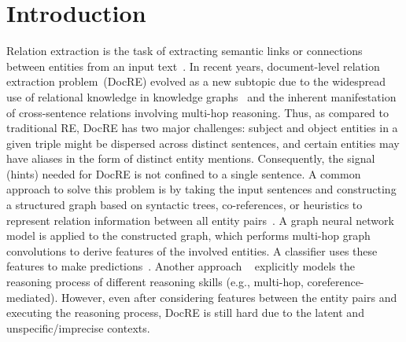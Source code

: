 \documentclass[letterpaper]{article} %
\begin{document}
\begin{abstract}
\end{abstract}


\section{Introduction}
Relation extraction is the task of extracting semantic links or connections between entities from an input text~\cite{baldini-soares-etal-2019-matching}.
In recent years, document-level relation extraction problem~(DocRE) evolved as a new subtopic due to the widespread use of relational knowledge in knowledge graphs~\cite{yu-etal-2017-improved} and the inherent manifestation of cross-sentence relations involving multi-hop reasoning. 
Thus, as compared to traditional RE, DocRE has two major challenges: subject and object entities in a given triple might be dispersed across distinct sentences, and certain entities may have aliases in the form of distinct entity mentions. Consequently, the signal (hints) needed for DocRE is not confined to a single sentence. A common approach to solve this problem is by taking the input sentences and constructing a structured graph based on syntactic trees, co-references, or heuristics to represent relation information between all entity pairs~\cite{nan-etal-2020-reasoning}. A graph neural network model is applied to the constructed graph, which performs multi-hop graph convolutions to derive features of the involved entities. A classifier uses these features to make predictions~\cite{DBLP:conf/aaai/ZhangCZW20}. Another approach ~\cite{xu-etal-2021-discriminative,10.1145/3572898} explicitly models the reasoning process of different reasoning skills (e.g., multi-hop, coreference-mediated). However, even after considering features between the entity pairs and executing the reasoning process, DocRE is still hard due to the latent and unspecific/imprecise contexts. 
\end{document}
